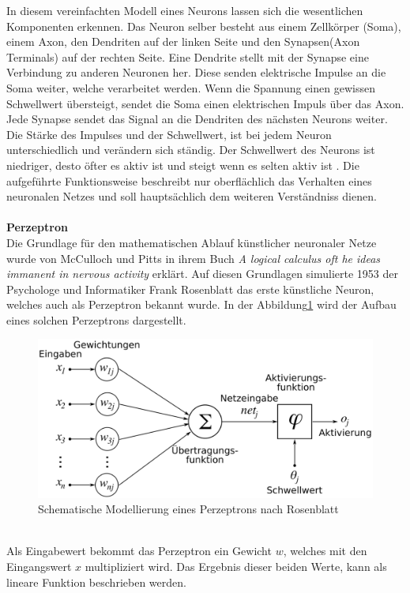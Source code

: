 \documentclass[a4paper,12pt,oneside]{article}
\begin{document}
In diesem vereinfachten Modell eines Neurons lassen sich die wesentlichen Komponenten erkennen. Das Neuron selber besteht aus einem Zellkörper (Soma), einem Axon, den Dendriten auf der linken Seite und den Synapsen(Axon Terminals) auf der rechten Seite. Eine Dendrite stellt mit der Synapse eine Verbindung zu anderen Neuronen her. Diese senden elektrische Impulse an die Soma weiter, welche verarbeitet werden. Wenn die Spannung einen gewissen Schwellwert übersteigt, sendet die Soma einen elektrischen Impuls über das Axon. Jede Synapse sendet das Signal an die Dendriten des nächsten Neurons weiter. Die Stärke des Impulses und der Schwellwert, ist bei jedem Neuron unterschiedlich und verändern sich ständig. Der Schwellwert des Neurons ist niedriger, desto öfter es aktiv ist und steigt wenn es selten aktiv ist \cite{schmidt2013physiologie}. Die aufgeführte Funktionsweise beschreibt nur oberflächlich das Verhalten eines neuronalen Netzes und soll hauptsächlich dem weiteren Verständniss dienen.\\\\
\textbf{Perzeptron}\\
Die Grundlage für den mathematischen Ablauf künstlicher neuronaler Netze wurde von McCulloch und Pitts in ihrem Buch \textit{A logical calculus oft he ideas immanent in nervous activity} erklärt. Auf diesen Grundlagen simulierte 1953 der Psychologe und Informatiker Frank Rosenblatt das erste künstliche Neuron, welches auch als Perzeptron bekannt wurde. In der Abbildung\ref{img:Perzeptron} wird der Aufbau eines solchen Perzeptrons dargestellt.\\
\begin{figure}
	[h]
	\centering
	\includegraphics[scale=0.3]{Sources/perzeptron2.png}
	\caption{Schematische Modellierung eines Perzeptrons nach Rosenblatt \cite{perzeptron2019}}
	\label{img:Perzeptron}
\end{figure}\\
Als Eingabewert bekommt das Perzeptron ein Gewicht $w$, welches mit den Eingangswert $x$ multipliziert wird. Das Ergebnis dieser beiden Werte, kann als lineare Funktion beschrieben werden.\\
\end{document}
